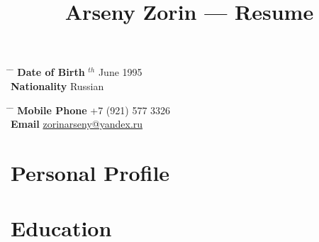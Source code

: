 \documentclass[10pt]{article} %
\begin{document}

\title{Arseny Zorin --- Resume} %


\parbox{0.5\textwidth}{ %
\begin{tabbing} %
\hspace{3cm} \= \hspace{4cm} \= \kill %
{\bf Date of Birth} $^{th}$ June 1995 \\ %
{\bf Nationality} \> Russian %
\end{tabbing}}
\hfill %
\parbox{0.5\textwidth}{ %
\begin{tabbing} %
\hspace{3cm} \= \hspace{4cm} \= \kill %
{\bf Mobile Phone} \> +7 (921) 577 3326 \\ %
{\bf Email} \> \href{mailto:zorinarseny@yandex.ru}{zorinarseny@yandex.ru} \\ %
\end{tabbing}}


\section{Personal Profile}


\section{Education}

\end{document}
